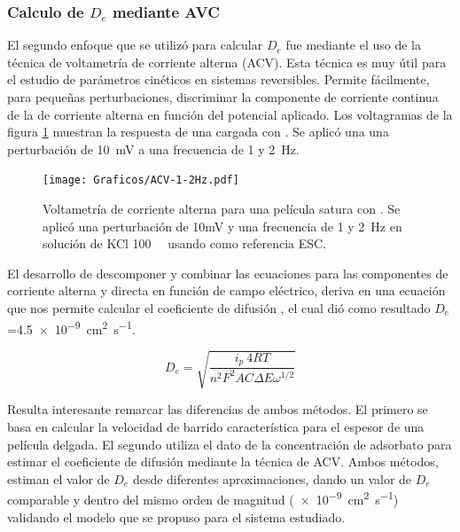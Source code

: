 	 \subsubsection*{Calculo de $D_e$ mediante AVC}

    	 El segundo enfoque que se utilizó para calcular $D_e$ fue mediante el uso de la técnica de voltametría de corriente alterna (ACV). Esta técnica es muy útil para el estudio de parámetros cinéticos en sistemas reversibles. Permite fácilmente, para pequeñas perturbaciones, discriminar la componente de corriente continua de la de corriente alterna en función del potencial aplicado. Los voltagramas de la figura \ref{fig:acv} muestran la respuesta de una \pdmF\space cargada con \ru. Se aplicó una una perturbación de \SI{10}{\milli\volt} a una frecuencia de 1 y \SI{2}{\hertz}.

	 			\begin{figure}[ht]
					\centering
			 	    \texttt{[image: Graficos/ACV-1-2Hz.pdf]}
			        \caption[Voltametrías de corriente alterna]{Voltametría de corriente alterna para una película satura con \ru. Se aplicó una perturbación de 10mV y una frecuencia de 1 y \SI{2}{\hertz} en solución de KCl \SI{100}{\milli\Molar} usando como referencia ESC.}
			        \label{fig:acv}
			      	\end{figure}

    	 El desarrollo de descomponer y combinar las ecuaciones para las componentes de corriente alterna y directa en función de campo eléctrico, deriva en una ecuación que nos permite calcular el coeficiente de difusión \cite{Wi2000}, el cual dió como resultado $D_e$=\SI{4.5e-9}{\square\cm\per\second}. 
    	 	
    	 		\begin{equation}
					D_e=\sqrt{\frac{i_p\ 4RT}{n^2 F^2 A C \Delta E \omega ^{1/2}}}
					\label{eq:acv}
				 \end{equation}

		
		 Resulta interesante remarcar las diferencias de ambos métodos. El primero se basa en calcular la velocidad de barrido característica para el espesor de una película delgada. El segundo utiliza el dato de la concentración de adsorbato para estimar el coeficiente de difusión mediante la técnica de ACV. Ambos métodos, estiman el valor de $D_e$ desde diferentes aproximaciones, dando un valor de $D_e$ comparable y dentro del mismo orden de magnitud (\SI{e-9}{\square\cm\per\second}) validando el modelo que se propuso para el sistema estudiado.
			
